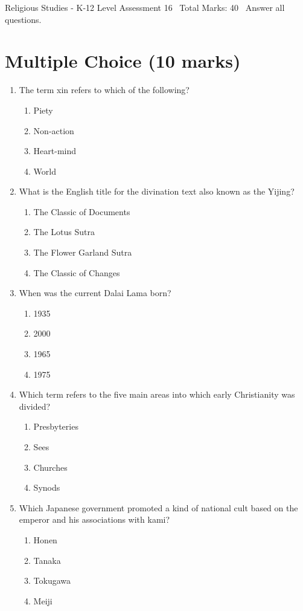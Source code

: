 \documentclass[12pt]{article}
\begin{document}
\begin{center}
Religious Studies - K-12 Level Assessment 16 \
Total Marks: 40 \
Answer all questions.
\end{center}

\section*{Multiple Choice (10 marks)}
\begin{enumerate}[label=\arabic*.]
\item The term xin refers to which of the following?
\begin{enumerate}[label=(\alph*)]
    \item Piety
    \item Non-action
    \item Heart-mind
    \item World
\end{enumerate}
\item What is the English title for the divination text also known as the Yijing?
\begin{enumerate}[label=(\alph*)]
    \item The Classic of Documents
    \item The Lotus Sutra
    \item The Flower Garland Sutra
    \item The Classic of Changes
\end{enumerate}
\item When was the current Dalai Lama born?
\begin{enumerate}[label=(\alph*)]
    \item 1935
    \item 2000
    \item 1965
    \item 1975
\end{enumerate}
\item Which term refers to the five main areas into which early Christianity was divided?
\begin{enumerate}[label=(\alph*)]
    \item Presbyteries
    \item Sees
    \item Churches
    \item Synods
\end{enumerate}
\item Which Japanese government promoted a kind of national cult based on the emperor and his associations with kami?
\begin{enumerate}[label=(\alph*)]
    \item Honen
    \item Tanaka
    \item Tokugawa
    \item Meiji
\end{enumerate}
\end{enumerate}
\end{document}
